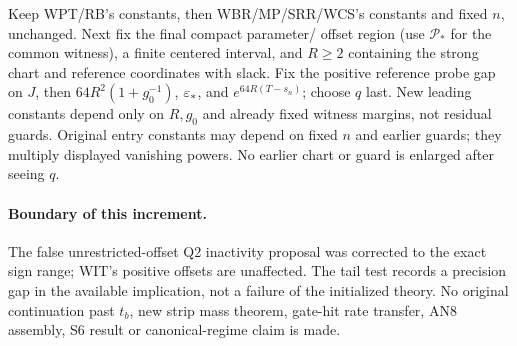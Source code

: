 \documentclass[11pt]{article}
\numberwithin{equation}{section}
\theoremstyle{remark}\newtheorem{remark}[theorem]{Remark}
\begin{document}
Keep WPT/RB's constants, then WBR/MP/SRR/WCS's constants and
fixed \(n\), unchanged. Next fix the final compact parameter/
offset region (use \(\mathcal P_*\) for the common witness),
a finite centered interval, and \(R\ge2\) containing the
strong chart and reference coordinates with slack. Fix the
positive reference probe gap on \(J\), then
\(64R^2(1+g_0^{-1})\), \(\varepsilon_*\), and
\(e^{64R(T-s_n)}\); choose \(q\) last.
New leading constants depend only on \(R,g_0\) and already
fixed witness margins, not residual guards. Original entry
constants may depend on fixed \(n\) and earlier guards; they
multiply displayed vanishing powers. No earlier chart or guard
is enlarged after seeing \(q\).

\paragraph{Boundary of this increment.}
The false unrestricted-offset Q2 inactivity proposal was
corrected to the exact sign range; WIT's positive offsets are
unaffected. The tail test records a precision gap in the
available implication, not a failure of the initialized theory.
No original continuation past \(t_b\), new strip mass theorem,
gate-hit rate transfer, AN8 assembly, S6 result or
canonical-regime claim is made.
\end{document}
